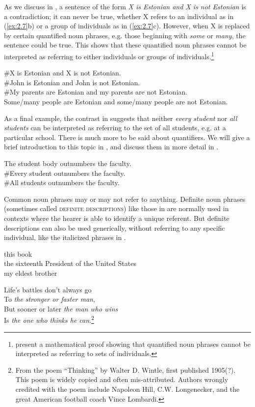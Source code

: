 As we discuss in , a sentence of the form \textit{X is Estonian and X is not Estonian} is a contradiction; it can never be true, whether X refers to an individual as in (\ref{ex:2.7}b) or a group of individuals as in (\ref{ex:2.7}c). However, when X is replaced by certain quantified noun phrases, e.g. those beginning with \textit{some} or \textit{many}, the sentence could be true. This shows that these quantified noun phrases cannot be interpreted as referring to either individuals or groups of individuals.\footnote{\citet[49–52]{PetersWesterståhl2006} present a mathematical proof showing that quantified noun phrases cannot be interpreted as referring to sets of individuals.}


\ea  \label{ex:2.7}
\ea \#X is Estonian and X is not Estonian.\\
\ex \#John is Estonian and John is not Estonian.\\
\ex \#My parents are Estonian and my parents are not Estonian.\\
\ex Some/many people are Estonian and some/many people are not Estonian.
\z
\z


As a final example, the contrast in  suggests that neither \textit{every student} nor \textit{all students} can be interpreted as referring to the set of all students, e.g. at a particular school. There is much more to be said about quantifiers. We will give a brief introduction to this topic in , and discuss them in more detail in .


\ea \label{ex:2.8}
\ea The student body outnumbers the faculty.\\                
\ex \#Every student outnumbers the faculty.\\
\ex \#All students outnumbers the faculty.
\z
\z


Common noun phrases may or may not refer to anything. Definite noun phrases (sometimes called \textsc{definite descriptions}) like those in  are normally used in contexts where the hearer is able to identify a unique referent. But definite descriptions can also be used generically, without referring to any specific individual, like the italicized phrases in .


\ea \label{ex:2.9}
\ea this book\\
\ex the sixteenth President of the United States\\
\ex my eldest brother
                       \z
\z

\ea \label{ex:2.10}
Life’s battles don’t always go\\
\hspace{5mm}   To \textit{the stronger or faster man},\\
But sooner or later \textit{the man who wins}\\
\hspace{5mm}   Is \textit{the one who thinks he can}.\footnote{From the poem “Thinking” by Walter D. Wintle, first published 1905(?). This poem is widely copied and often mis-attributed. Authors wrongly credited with the poem include Napoleon Hill, C.W. Longenecker, and the great American football coach Vince Lombardi.}
\z


